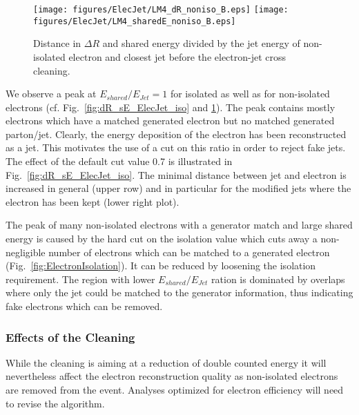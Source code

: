 \documentclass{cmspaper}
\begin{document}
\begin{figure}[htbp]
\begin{center}
    \texttt{[image: figures/ElecJet/LM4\_dR\_noniso\_B.eps]}
    \texttt{[image: figures/ElecJet/LM4\_sharedE\_noniso\_B.eps]}
    \caption{Distance in $\Delta R$ and shared energy divided by the jet energy
    of non-isolated electron and closest jet before the electron-jet cross cleaning.}
\label{fig:dR_sE_ElecJet_noniso}
\end{center}
\end{figure}

We observe a peak at $E_{shared}/E_{Jet}=1$ for isolated as well as for
non-isolated electrons (cf. Fig.~\ref{fig:dR_sE_ElecJet_iso} and
\ref{fig:dR_sE_ElecJet_noniso}). The peak contains mostly electrons which have a
matched generated electron but no matched generated parton/jet. Clearly, the
energy deposition of the electron has been reconstructed as a jet. This
motivates the use of a cut on this ratio in order to reject fake jets.  The
effect of the default cut value 0.7 is illustrated in Fig.~\ref{fig:dR_sE_ElecJet_iso}.
The minimal distance between jet and electron is increased in general (upper
row) and in particular for the modified jets where the electron has been kept
(lower right plot).

The peak of many non-isolated electrons with a generator match and large shared
energy is caused by the hard cut on the isolation value which cuts away a
non-negligible number of electrons which can be matched to a generated electron
(Fig.~\ref{fig:ElectronIsolation}). It can be reduced by loosening the
isolation requirement.
The region with lower $E_{shared}/E_{Jet}$ ration is dominated by overlaps
where only the jet could be matched to the generator information, thus
indicating fake electrons which can be removed.



\subsubsection{Effects of the Cleaning}
While the cleaning is aiming at a reduction of double counted energy it will
nevertheless affect the electron reconstruction quality as non-isolated
electrons are removed from the event. Analyses optimized for electron efficiency
will need to revise the algorithm.
\end{document}
